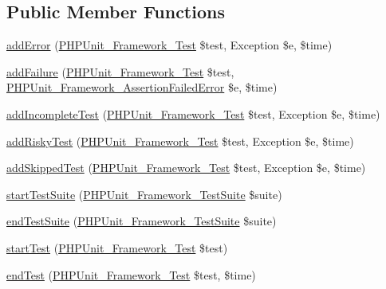 \subsection*{Public Member Functions}
\begin{DoxyCompactItemize}
\item 
\mbox{\hyperlink{interface_p_h_p_unit___framework___test_listener_a320d7bc7d2f9264ee7ba7aca6fd2df41}{add\+Error}} (\mbox{\hyperlink{interface_p_h_p_unit___framework___test}{P\+H\+P\+Unit\+\_\+\+Framework\+\_\+\+Test}} \$test, Exception \$e, \$time)
\item 
\mbox{\hyperlink{interface_p_h_p_unit___framework___test_listener_a668f17b68705c5c8686bac690a6f719d}{add\+Failure}} (\mbox{\hyperlink{interface_p_h_p_unit___framework___test}{P\+H\+P\+Unit\+\_\+\+Framework\+\_\+\+Test}} \$test, \mbox{\hyperlink{class_p_h_p_unit___framework___assertion_failed_error}{P\+H\+P\+Unit\+\_\+\+Framework\+\_\+\+Assertion\+Failed\+Error}} \$e, \$time)
\item 
\mbox{\hyperlink{interface_p_h_p_unit___framework___test_listener_a81bfe09a62194fe5769ca1cc36ee428b}{add\+Incomplete\+Test}} (\mbox{\hyperlink{interface_p_h_p_unit___framework___test}{P\+H\+P\+Unit\+\_\+\+Framework\+\_\+\+Test}} \$test, Exception \$e, \$time)
\item 
\mbox{\hyperlink{interface_p_h_p_unit___framework___test_listener_ad161e7d13b117cb0af3967cd2adc6bba}{add\+Risky\+Test}} (\mbox{\hyperlink{interface_p_h_p_unit___framework___test}{P\+H\+P\+Unit\+\_\+\+Framework\+\_\+\+Test}} \$test, Exception \$e, \$time)
\item 
\mbox{\hyperlink{interface_p_h_p_unit___framework___test_listener_a1c0cb3bc58e5807530daf3a93783ed4e}{add\+Skipped\+Test}} (\mbox{\hyperlink{interface_p_h_p_unit___framework___test}{P\+H\+P\+Unit\+\_\+\+Framework\+\_\+\+Test}} \$test, Exception \$e, \$time)
\item 
\mbox{\hyperlink{interface_p_h_p_unit___framework___test_listener_a901a86a623d83184267b21f2daee0ff5}{start\+Test\+Suite}} (\mbox{\hyperlink{class_p_h_p_unit___framework___test_suite}{P\+H\+P\+Unit\+\_\+\+Framework\+\_\+\+Test\+Suite}} \$suite)
\item 
\mbox{\hyperlink{interface_p_h_p_unit___framework___test_listener_aeec28a4d1328434916ebcdc1ca6b5527}{end\+Test\+Suite}} (\mbox{\hyperlink{class_p_h_p_unit___framework___test_suite}{P\+H\+P\+Unit\+\_\+\+Framework\+\_\+\+Test\+Suite}} \$suite)
\item 
\mbox{\hyperlink{interface_p_h_p_unit___framework___test_listener_a1a9bddc54f26bb3fb5c2ec9778ea5198}{start\+Test}} (\mbox{\hyperlink{interface_p_h_p_unit___framework___test}{P\+H\+P\+Unit\+\_\+\+Framework\+\_\+\+Test}} \$test)
\item 
\mbox{\hyperlink{interface_p_h_p_unit___framework___test_listener_a6de65eea8b294795cbc34c4c8cee8546}{end\+Test}} (\mbox{\hyperlink{interface_p_h_p_unit___framework___test}{P\+H\+P\+Unit\+\_\+\+Framework\+\_\+\+Test}} \$test, \$time)
\end{DoxyCompactItemize}


